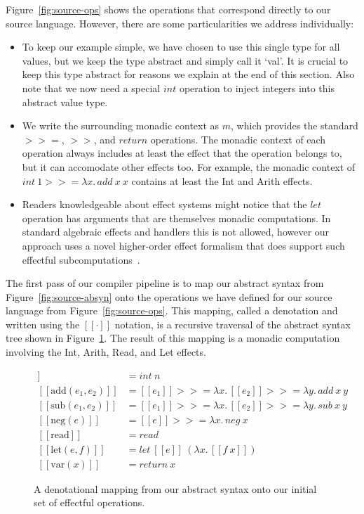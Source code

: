 \documentclass[a4paper,UKenglish,cleveref, autoref, thm-restate, anonymous]{oasics-v2021}
\newcommand\bind[1]{>\!\!>\!\!= \lambda #1.\,}
\begin{document}
Figure~\ref{fig:source-ops} shows the operations that correspond directly to our source language.
However, there are some particularities we address individually:
\begin{itemize}
  \item 
    To keep our example simple, we have chosen to use this single type for all values, but we keep the type abstract and simply call it `val'.
    It is crucial to keep this type abstract for reasons we explain at the end of this section.
    Also note that we now need a special $\mathit{int}$ operation to inject integers into this abstract value type.
  \item 
    We write the surrounding monadic context as $m$, which provides the standard $>\!\!>\!\!=$, $>\!\!>$, and $\mathit{return}$ operations.
    The monadic context of each operation always includes at least the effect that the operation belongs to, but it can accomodate other effects too.
    For example, the monadic context of $\mathit{int}~1 \bind{x} \mathit{add}~x~x$ contains at least the Int and Arith effects.
  \item
    Readers knowledgeable about effect systems might notice that the $\mathit{let}$ operation has arguments that are themselves monadic computations.
    In standard algebraic effects and handlers this is not allowed, however our approach uses a novel higher-order effect formalism that does support such effectful subcomputations~\cite{BachPoulsen2022heftyalgebras}.
\end{itemize}

The first pass of our compiler pipeline is to map our abstract syntax from Figure~\ref{fig:source-absyn} onto the operations we have defined for our source language from Figure~\ref{fig:source-ops}.
This mapping, called a denotation and written using the $[\![ \cdot ]\!]$ notation, is a recursive traversal of the abstract syntax tree shown in Figure~\ref{fig:den}.
The result of this mapping is a monadic computation involving the Int, Arith, Read, and Let effects.

\begin{figure}[ht]
\begin{align*}
  [\![ \mathrm{int}(n) ]\!] & = \mathit{int}~n \\
  [\![ \mathrm{add}(e_1, e_2) ]\!] & = [\![ e_1 ]\!] \bind{x} [\![ e_2 ]\!] \bind{y} \mathit{add}~x~y \\
  [\![ \mathrm{sub}(e_1, e_2) ]\!] & = [\![ e_1 ]\!] \bind{x} [\![ e_2 ]\!] \bind{y} \mathit{sub}~x~y \\
  [\![ \mathrm{neg}(e) ]\!] & = [\![ e ]\!] \bind{x} \mathit{neg}~x \\
  [\![ \mathrm{read} ]\!] & = \mathit{read} \\
  [\![ \mathrm{let}(e,f) ]\!] & = \mathit{let}~[\![e]\!]~(\lambda x.\, [\![ f~x ]\!]) \\
  [\![ \mathrm{var}(x) ]\!] & = \mathit{return}~x
\end{align*}
  \caption{A denotational mapping from our abstract syntax onto our initial set of effectful operations.}\label{fig:den}
\end{figure}
\end{document}
